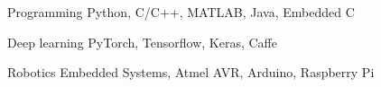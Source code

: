 

\smallskip

\begin{cvskills}

  \cvskill
    {Programming} %
    {Python, C/C++, MATLAB, Java, Embedded C} %

  \cvskill
    {Deep learning} %
    {PyTorch, Tensorflow, Keras, Caffe} %

  \cvskill
    {Robotics} %
    {Embedded Systems, Atmel AVR, Arduino, Raspberry Pi} %


\end{cvskills}
